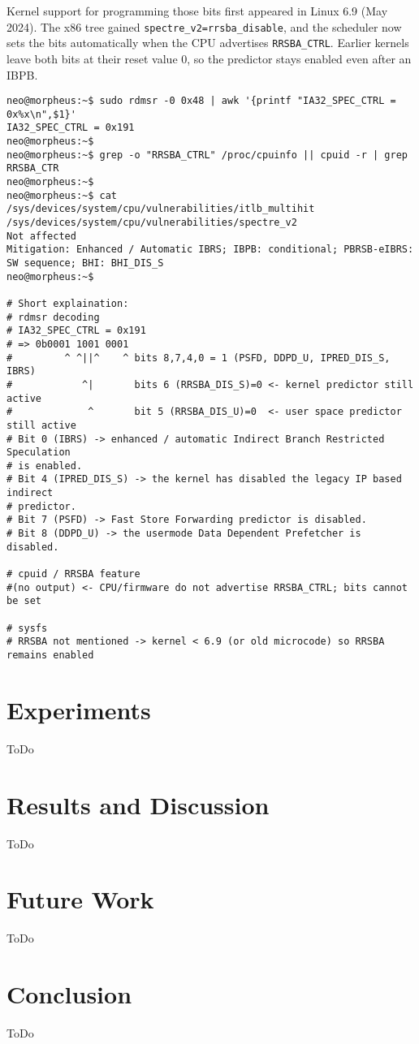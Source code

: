\documentclass[11pt,a4paper]{article}
\begin{document}
Kernel support for programming those bits first appeared in Linux 6.9 (May 2024).  The x86 tree gained \texttt{spectre\_v2=rrsba\_disable}, and the scheduler now sets the bits automatically when the CPU advertises \texttt{RRSBA\_CTRL}. Earlier kernels leave both bits at their reset value 0, so the predictor stays enabled even after an IBPB.\\

\vspace{-0.5em}
\begin{lstlisting}[style=bash-nonitalic, caption={\texttt{attacker\_rrsba\_injection\_test.sh}}]
neo@morpheus:~$ sudo rdmsr -0 0x48 | awk '{printf "IA32_SPEC_CTRL = 0x%x\n",$1}'
IA32_SPEC_CTRL = 0x191
neo@morpheus:~$
neo@morpheus:~$ grep -o "RRSBA_CTRL" /proc/cpuinfo || cpuid -r | grep RRSBA_CTR
neo@morpheus:~$
neo@morpheus:~$ cat /sys/devices/system/cpu/vulnerabilities/itlb_multihit /sys/devices/system/cpu/vulnerabilities/spectre_v2
Not affected
Mitigation: Enhanced / Automatic IBRS; IBPB: conditional; PBRSB-eIBRS: SW sequence; BHI: BHI_DIS_S
neo@morpheus:~$

# Short explaination:
# rdmsr decoding
# IA32_SPEC_CTRL = 0x191
# => 0b0001 1001 0001
#         ^ ^||^    ^ bits 8,7,4,0 = 1 (PSFD, DDPD_U, IPRED_DIS_S, IBRS)
#            ^|       bits 6 (RRSBA_DIS_S)=0 <- kernel predictor still active
#             ^       bit 5 (RRSBA_DIS_U)=0  <- user space predictor still active
# Bit 0 (IBRS) -> enhanced / automatic Indirect Branch Restricted Speculation
# is enabled.
# Bit 4 (IPRED_DIS_S) -> the kernel has disabled the legacy IP based indirect
# predictor.
# Bit 7 (PSFD) -> Fast Store Forwarding predictor is disabled.
# Bit 8 (DDPD_U) -> the usermode Data Dependent Prefetcher is disabled.

# cpuid / RRSBA feature
#(no output) <- CPU/firmware do not advertise RRSBA_CTRL; bits cannot be set

# sysfs
# RRSBA not mentioned -> kernel < 6.9 (or old microcode) so RRSBA remains enabled
\end{lstlisting}

\section{Experiments}
ToDo

\section{Results and Discussion}
ToDo

\section{Future Work}
ToDo

\section{Conclusion}
ToDo




\end{document}
